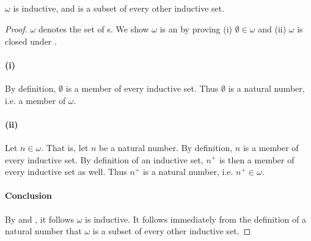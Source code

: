 \documentclass{report}
\begin{document}
\subsection{}%

  \begin{theorem}[4B]
    $\omega$ is inductive, and is a subset of every other inductive set.
  \end{theorem}

  \begin{proof}

    $\omega$ denotes the set of s.
    We show $\omega$ is an  by proving (i)
      $\emptyset \in \omega$ and (ii) $\omega$ is closed under
      .

    \paragraph{(i)}%

      By definition, $\emptyset$ is a member of every inductive set.
      Thus $\emptyset$ is a natural number, i.e. a member of $\omega$.

    \paragraph{(ii)}%

      Let $n \in \omega$.
      That is, let $n$ be a natural number.
      By definition, $n$ is a member of every inductive set.
      By definition of an inductive set, $n^+$ is then a member of every
        inductive set as well.
      Thus $n^+$ is a natural number, i.e. $n^+ \in \omega$.

    \paragraph{Conclusion}%

      By  and , it follows
        $\omega$ is inductive.
      It follows immediately from the definition of a natural number that
        $\omega$ is a subset of every other inductive set.

  \end{proof}

\subsection{}%
\end{document}
